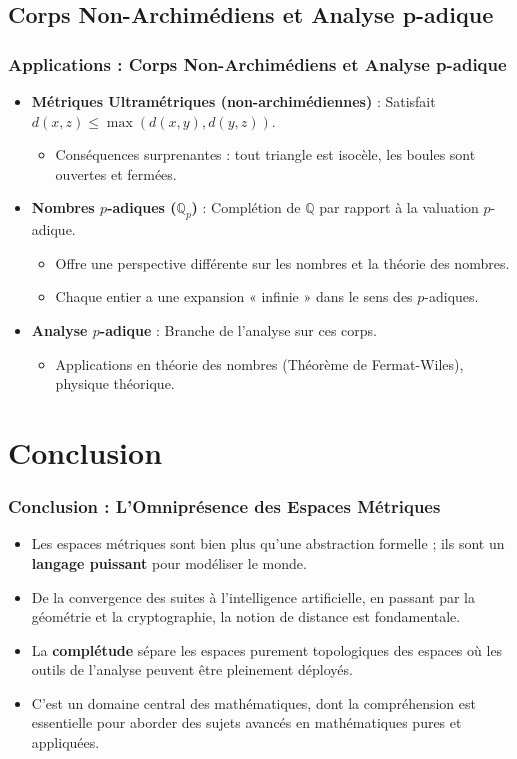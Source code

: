 \documentclass{beamer}
\begin{document}
\subsection*{Corps Non-Archimédiens et Analyse p-adique}
\begin{frame}
	\frametitle{Applications : Corps Non-Archimédiens et Analyse p-adique}
	\begin{itemize}
		\item \textbf{Métriques Ultramétriques (non-archimédiennes)} : Satisfait $d(x, z) \le \max(d(x, y), d(y, z))$.
		      \begin{itemize}
			      \item Conséquences surprenantes : tout triangle est isocèle, les boules sont ouvertes et fermées.
		      \end{itemize}
		\item \textbf{Nombres $p$-adiques ($\mathbb{Q}_p$)} : Complétion de $\mathbb{Q}$ par rapport à la valuation $p$-adique.
		      \begin{itemize}
			      \item Offre une perspective différente sur les nombres et la théorie des nombres.
			      \item Chaque entier a une expansion « infinie » dans le sens des $p$-adiques.
		      \end{itemize}
		\item \textbf{Analyse $p$-adique} : Branche de l'analyse sur ces corps.
		      \begin{itemize}
			      \item Applications en théorie des nombres (Théorème de Fermat-Wiles), physique théorique.
		      \end{itemize}
	\end{itemize}
\end{frame}

\section*{Conclusion}
\begin{frame}
	\frametitle{Conclusion : L'Omniprésence des Espaces Métriques}
	\begin{itemize}
		\item Les espaces métriques sont bien plus qu'une abstraction formelle ; ils sont un \textbf{langage puissant} pour modéliser le monde.
		\item De la convergence des suites à l'intelligence artificielle, en passant par la géométrie et la cryptographie, la notion de distance est fondamentale.
		\item La \textbf{complétude} sépare les espaces purement topologiques des espaces où les outils de l'analyse peuvent être pleinement déployés.
		\item C'est un domaine central des mathématiques, dont la compréhension est essentielle pour aborder des sujets avancés en mathématiques pures et appliquées.
	\end{itemize}
\end{frame}
\end{document}
